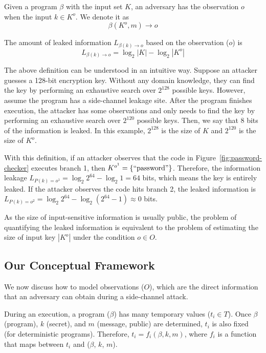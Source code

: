 \begin{mydef}
    \label{def}
    Given a program $\beta$ with the input set $K$,
    an adversary has the observation $o$ when the input $k{\in}K^o$.
    We denote it as
    $$\beta(K^o, m) \rightarrow	o$$

    The amount of leaked information $L_{\beta(k)\rightarrow o}$ based on the observation ($o$) is
    $$L_{\beta(k)\rightarrow o} = \log_2{|K|} - \log_2{|K^o|}$$
\end{mydef}
\vspace*{-5pt}

The above definition can be understood in an intuitive way. Suppose an attacker
guesses a 128-bit encryption key. 
Without any domain knowledge, 
they can find the key by performing an exhaustive search over $2^{128}$ possible keys. 
However, assume the program has a side-channel leakage site. After the program finishes execution, the
attacker has some observations and only needs to find the key by performing an
exhaustive search over $2^{120}$ possible keys. Then, we say that 8 bits of the information
is leaked. In this example, $2^{128}$ is the size of $K$ and $2^{120}$ is the size of $K^o$.

With this definition, if an attacker observes that the code in
Figure~\ref{fig:password-checker} executes branch 1, then $K^{o^{1}} =
\{\mathrm{``password"}\}$. Therefore, the information leakage $L_{P(k)=o^{1}} =
\log_2{2^{64}} - \log_2{1} = 64$ bits, which means the key is entirely leaked. If
the attacker observes the code hits branch 2, the leaked information is
$L_{P(k)=o^{2}} = \log_2{2^{64}} - \log_2{(2^{64}-1)} \approx 0$ bits.

As the size of input-sensitive information is
usually public, the problem of quantifying the leaked information is equivalent to the problem of estimating the size of input key $|K^o|$ under
the condition $o \in O$. 

\subsection{Our Conceptual Framework}
\label{side-channel:condition}
We now discuss how to model observations ($O$), which are the direct information
that an adversary can obtain during a side-channel attack.

During an execution, a program ($\beta$) has many temporary values ($t_i \in
T$). Once $\beta$ (program), $k$ (secret), and $m$ (message, public) are
determined, $t_i$ is also fixed (for deterministic programs). Therefore, $ t_i = f_i(\beta, k, m)$, where $f_i$ is a function that maps between $t_i$ and ($\beta$, $k$, $m$).

